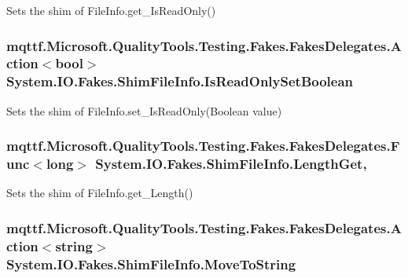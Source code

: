 Sets the shim of File\-Info.\-get\-\_\-\-Is\-Read\-Only()

\hypertarget{class_system_1_1_i_o_1_1_fakes_1_1_shim_file_info_a20dd265ff7ebc7b051ebdc48ea9270ff}{
\subsubsection[{Is\-Read\-Only\-Set\-Boolean}]{\setlength{\rightskip}{0pt plus 5cm}mqttf.\-Microsoft.\-Quality\-Tools.\-Testing.\-Fakes.\-Fakes\-Delegates.\-Action$<$bool$>$ System.\-I\-O.\-Fakes.\-Shim\-File\-Info.\-Is\-Read\-Only\-Set\-Boolean\hspace{0.3cm}{\ttfamily [set]}}}\label{class_system_1_1_i_o_1_1_fakes_1_1_shim_file_info_a20dd265ff7ebc7b051ebdc48ea9270ff}


Sets the shim of File\-Info.\-set\-\_\-\-Is\-Read\-Only(\-Boolean value)

\hypertarget{class_system_1_1_i_o_1_1_fakes_1_1_shim_file_info_a50e2b3a3378ad95719e0259f436f3428}{
\subsubsection[{Length\-Get}]{\setlength{\rightskip}{0pt plus 5cm}mqttf.\-Microsoft.\-Quality\-Tools.\-Testing.\-Fakes.\-Fakes\-Delegates.\-Func$<$long$>$ System.\-I\-O.\-Fakes.\-Shim\-File\-Info.\-Length\-Get\hspace{0.3cm}{\ttfamily [get]}, {\ttfamily [set]}}}\label{class_system_1_1_i_o_1_1_fakes_1_1_shim_file_info_a50e2b3a3378ad95719e0259f436f3428}


Sets the shim of File\-Info.\-get\-\_\-\-Length()

\hypertarget{class_system_1_1_i_o_1_1_fakes_1_1_shim_file_info_a4cd434c5174efce6924bbcce413d91b9}{
\subsubsection[{Move\-To\-String}]{\setlength{\rightskip}{0pt plus 5cm}mqttf.\-Microsoft.\-Quality\-Tools.\-Testing.\-Fakes.\-Fakes\-Delegates.\-Action$<$string$>$ System.\-I\-O.\-Fakes.\-Shim\-File\-Info.\-Move\-To\-String\hspace{0.3cm}{\ttfamily [set]}}}\label{class_system_1_1_i_o_1_1_fakes_1_1_shim_file_info_a4cd434c5174efce6924bbcce413d91b9}


